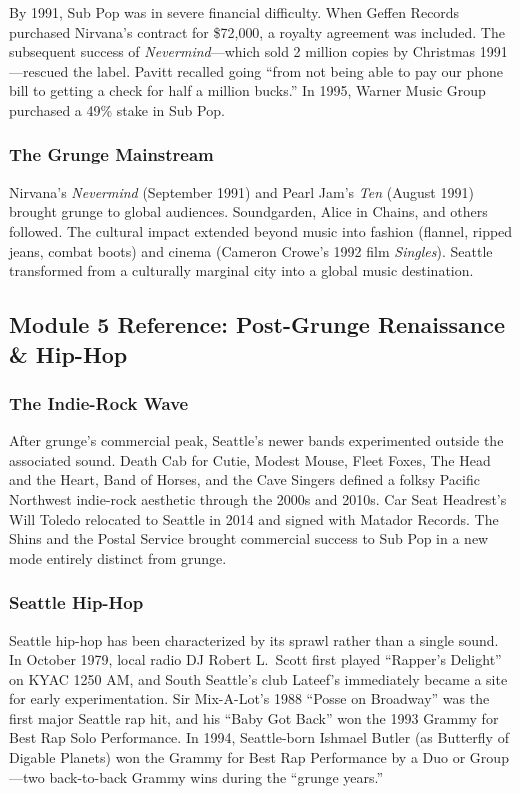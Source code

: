 \documentclass[11pt,letterpaper]{article}
\begin{document}
By 1991, Sub Pop was in severe financial difficulty. When Geffen Records purchased Nirvana's contract for \$72,000, a royalty agreement was included. The subsequent success of \textit{Nevermind}---which sold 2 million copies by Christmas 1991---rescued the label. Pavitt recalled going ``from not being able to pay our phone bill to getting a check for half a million bucks.'' In 1995, Warner Music Group purchased a 49\% stake in Sub Pop.

\subsubsection{The Grunge Mainstream}

Nirvana's \textit{Nevermind} (September 1991) and Pearl Jam's \textit{Ten} (August 1991) brought grunge to global audiences. Soundgarden, Alice in Chains, and others followed. The cultural impact extended beyond music into fashion (flannel, ripped jeans, combat boots) and cinema (Cameron Crowe's 1992 film \textit{Singles}). Seattle transformed from a culturally marginal city into a global music destination.

\subsection{Module 5 Reference: Post-Grunge Renaissance \& Hip-Hop}

\subsubsection{The Indie-Rock Wave}

After grunge's commercial peak, Seattle's newer bands experimented outside the associated sound. Death Cab for Cutie, Modest Mouse, Fleet Foxes, The Head and the Heart, Band of Horses, and the Cave Singers defined a folksy Pacific Northwest indie-rock aesthetic through the 2000s and 2010s. Car Seat Headrest's Will Toledo relocated to Seattle in 2014 and signed with Matador Records. The Shins and the Postal Service brought commercial success to Sub Pop in a new mode entirely distinct from grunge.

\subsubsection{Seattle Hip-Hop}

Seattle hip-hop has been characterized by its sprawl rather than a single sound. In October 1979, local radio DJ Robert L.\ Scott first played ``Rapper's Delight'' on KYAC 1250 AM, and South Seattle's club Lateef's immediately became a site for early experimentation. Sir Mix-A-Lot's 1988 ``Posse on Broadway'' was the first major Seattle rap hit, and his ``Baby Got Back'' won the 1993 Grammy for Best Rap Solo Performance. In 1994, Seattle-born Ishmael Butler (as Butterfly of Digable Planets) won the Grammy for Best Rap Performance by a Duo or Group---two back-to-back Grammy wins during the ``grunge years.''
\end{document}
